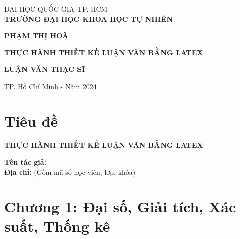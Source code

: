 \documentclass[a4paper,oneside]{book}
\begin{document}
\begin{titlepage}
    \begin{mdframed}[linewidth=3pt, linecolor=black, innerleftmargin=20pt, innerrightmargin=20pt, innertopmargin=20pt, innerbottommargin=20pt]
    \begin{center}
        \fontsize{14}{16}\selectfont
        ĐẠI HỌC QUỐC GIA TP. HCM\\
        \textbf{TRƯỜNG ĐẠI HỌC KHOA HỌC TỰ NHIÊN}
        
        \vspace{2cm}
        
        \fontsize{14}{16}\selectfont
        \textbf{PHẠM THỊ HOÀ}
        
        \vspace{1cm}
        
        \fontsize{16}{18}\selectfont
        \textbf{THỰC HÀNH THIẾT KẾ LUẬN VĂN BẰNG LATEX}
        
        \vspace{5cm}
        
        \fontsize{14}{16}\selectfont
        \textbf{LUẬN VĂN THẠC SĨ}
        
        \vspace{3cm}
        
        \fontsize{12}{14}\selectfont
        TP. Hồ Chí Minh - Năm 2024
    \end{center}
    \end{mdframed}
\end{titlepage}

\tableofcontents
\chapter*{Tiêu đề}
\begin{center}
    \Large
    \textbf{THỰC HÀNH THIẾT KẾ LUẬN VĂN BẰNG LATEX}
\end{center}

\vspace{1cm}

\begin{flushleft}
    \large
    \textbf{Tên tác giả:} \\
    \textbf{Địa chỉ:} (Gồm mã số học viên, lớp, khóa)
\end{flushleft}

\vspace{1cm}

\chapter{Chương 1: Đại số, Giải tích, Xác suất, Thống kê}
\end{document}
